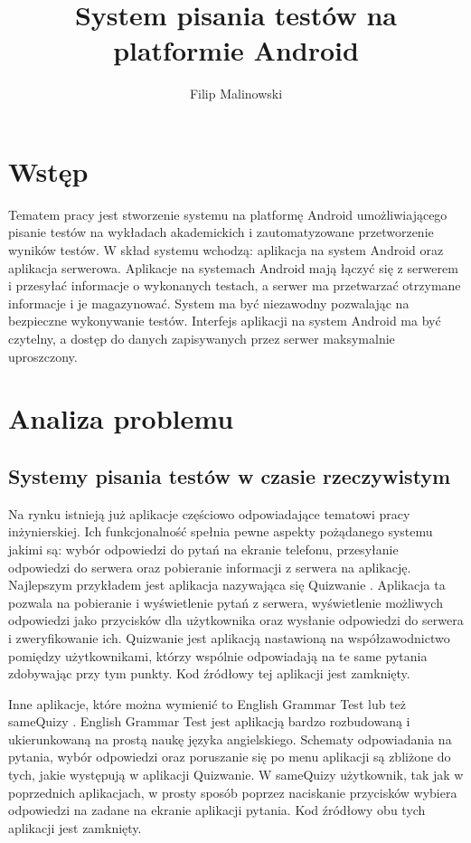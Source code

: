 \documentclass[eng]{mgr}
\title{System pisania testów na platformie Android}
\author{Filip Malinowski}
\begin{document}
\maketitle

\tableofcontents

	\chapter*{Wstęp}
	
	Tematem pracy jest stworzenie systemu na platformę Android umożliwiającego pisanie testów na wykładach akademickich i zautomatyzowane przetworzenie wyników testów. W skład systemu wchodzą: aplikacja na system Android oraz aplikacja serwerowa. Aplikacje na systemach Android mają łączyć się z serwerem i przesyłać informacje o wykonanych testach, a serwer ma przetwarzać otrzymane informacje i je magazynować. System ma być niezawodny pozwalając na bezpieczne wykonywanie testów. Interfejs aplikacji na system Android ma być czytelny, a dostęp do danych zapisywanych przez serwer maksymalnie uproszczony.

	
	\chapter{Analiza problemu}
	
		\section{Systemy pisania testów w czasie rzeczywistym}
		Na rynku istnieją już aplikacje częściowo odpowiadające tematowi pracy inżynierskiej. Ich funkcjonalność spełnia pewne aspekty pożądanego systemu jakimi są: wybór odpowiedzi do pytań na ekranie telefonu, przesyłanie odpowiedzi do serwera oraz pobieranie informacji z serwera na aplikację. Najlepszym przykładem jest aplikacja nazywająca się Quizwanie \cite{quizwanie}. Aplikacja ta pozwala na pobieranie i wyświetlenie pytań z serwera, wyświetlenie możliwych odpowiedzi jako przycisków dla użytkownika oraz wysłanie odpowiedzi do serwera i zweryfikowanie ich. Quizwanie jest aplikacją nastawioną na współzawodnictwo pomiędzy użytkownikami, którzy wspólnie odpowiadają na te same pytania zdobywając przy tym punkty. Kod źródłowy tej aplikacji jest zamknięty.
	
		Inne aplikacje, które można wymienić to English Grammar Test \cite{englishgrammar} lub też sameQuizy \cite{samequizy}. English Grammar Test jest aplikacją bardzo rozbudowaną i ukierunkowaną na prostą naukę języka angielskiego. Schematy odpowiadania na pytania, wybór odpowiedzi oraz poruszanie się po menu aplikacji są zbliżone do tych, jakie występują w aplikacji Quizwanie. W sameQuizy użytkownik, tak jak w poprzednich aplikacjach, w prosty sposób poprzez naciskanie przycisków wybiera odpowiedzi na zadane na ekranie aplikacji pytania. Kod źródłowy obu tych aplikacji jest zamknięty.
		
\end{document}
